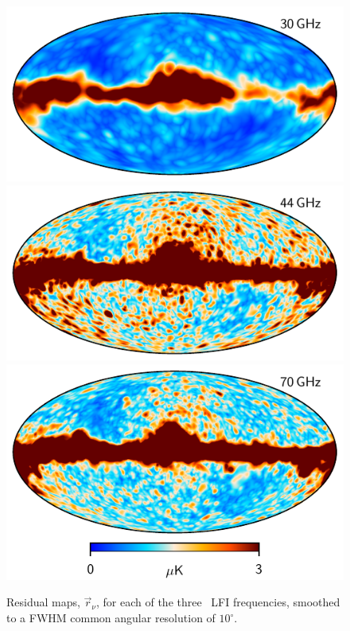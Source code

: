 \documentclass{aa}
\renewcommand{\r}[0]{\vec{r}}
\begin{document}
\begin{figure}
        \begin{center}
                \includegraphics[width=\linewidth]{figs/todres_030_maxabs.pdf}\\
                \includegraphics[width=\linewidth]{figs/todres_044_maxabs.pdf}\\
                \includegraphics[width=\linewidth]{figs/todres_070_maxabs.pdf}\\
        \end{center}
        \caption{Residual maps, $\r_{\nu}$, for each of the three
                \Planck\ LFI frequencies, smoothed to a FWHM common angular resolution
                of $10^{\circ}$. 
                \label{fig:todres}}
\end{figure}
\end{document}

